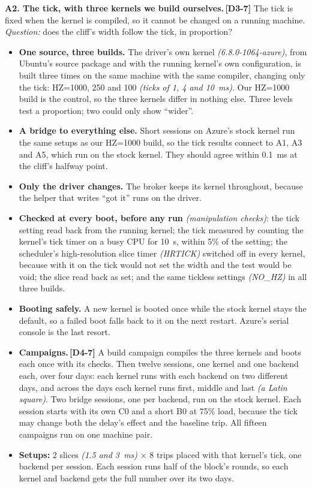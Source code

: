 \documentclass[11pt]{article}
\newcommand{\gl}[1]{{\color{soft}\itshape\small (#1)}}
\newcommand{\chgold}[1]{\,{\color{oldcol}\bfseries\footnotesize[#1]}}
\begin{document}
\textbf{A2. The tick, with three kernels we build ourselves.}\chgold{D3-7} The tick is fixed when the kernel is compiled, so it cannot be changed on a running machine. \emph{Question:} does the cliff's width follow the tick, in proportion?
\begin{itemize}
  \item \textbf{One source, three builds.} The driver's own kernel \gl{6.8.0-1064-azure}, from Ubuntu's source package and with the running kernel's own configuration, is built three times on the same machine with the same compiler, changing only the tick: HZ=1000, 250 and 100 \gl{ticks of 1, 4 and 10~ms}. Our HZ=1000 build is the control, so the three kernels differ in nothing else. Three levels test a proportion; two could only show ``wider''.
  \item \textbf{A bridge to everything else.} Short sessions on Azure's stock kernel run the same setups as our HZ=1000 build, so the tick results connect to A1, A3 and A5, which run on the stock kernel. They should agree within 0.1~ms at the cliff's halfway point.
  \item \textbf{Only the driver changes.} The broker keeps its kernel throughout, because the helper that writes ``got it'' runs on the driver.
  \item \textbf{Checked at every boot, before any run} \gl{manipulation checks}: the tick setting read back from the running kernel; the tick measured by counting the kernel's tick timer on a busy CPU for 10~s, within 5\% of the setting; the scheduler's high-resolution slice timer \gl{HRTICK} switched off in every kernel, because with it on the tick would not set the width and the test would be void; the slice read back as set; and the same tickless settings \gl{NO\_HZ} in all three builds.
  \item \textbf{Booting safely.} A new kernel is booted once while the stock kernel stays the default, so a failed boot falls back to it on the next restart. Azure's serial console is the last resort.
  \item \textbf{Campaigns.}\chgold{D4-7} A build campaign compiles the three kernels and boots each once with its checks. Then twelve sessions, one kernel and one backend each, over four days: each kernel runs with each backend on two different days, and across the days each kernel runs first, middle and last \gl{a Latin square}. Two bridge sessions, one per backend, run on the stock kernel. Each session starts with its own C0 and a short B0 at 75\% load, because the tick may change both the delay's effect and the baseline trip. All fifteen campaigns run on one machine pair.
  \item \textbf{Setups:} 2 slices \gl{1.5 and 3~ms} $\times$ 8 trips placed with that kernel's tick, one backend per session. Each session runs half of the block's rounds, so each kernel and backend gets the full number over its two days.
\end{itemize}
\end{document}
